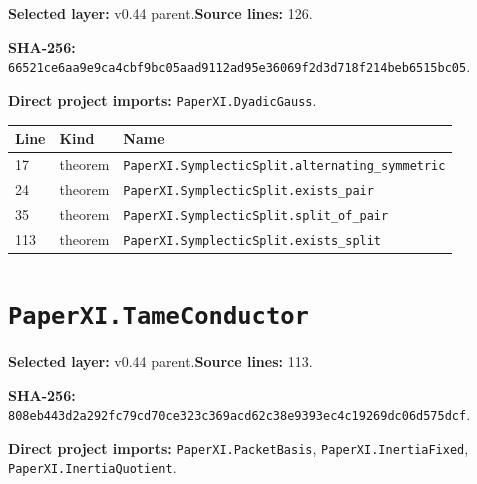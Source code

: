 \documentclass[10pt,oneside]{book}
\begin{document}
\textbf{Selected layer:} v0.44 parent.\quad\textbf{Source lines:} 126.\par\textbf{SHA-256:} {\scriptsize\nolinkurl{66521ce6aa9e9ca4cbf9bc05aad9112ad95e36069f2d3d718f214beb6515bc05}}.


\textbf{Direct project imports:} \nolinkurl{PaperXI.DyadicGauss}.

\begin{longtable}{@{}p{}p{}p{}@{}}\toprule Line&Kind&Name\\\midrule\endhead

17&theorem&\nolinkurl{PaperXI.SymplecticSplit.alternating_symmetric}\\

24&theorem&\nolinkurl{PaperXI.SymplecticSplit.exists_pair}\\

35&theorem&\nolinkurl{PaperXI.SymplecticSplit.split_of_pair}\\

113&theorem&\nolinkurl{PaperXI.SymplecticSplit.exists_split}\\

\bottomrule\end{longtable}

\section{\texorpdfstring{\nolinkurl{PaperXI.TameConductor}}{PaperXI.TameConductor}}\label{module:PaperXI.TameConductor}

\textbf{Selected layer:} v0.44 parent.\quad\textbf{Source lines:} 113.\par\textbf{SHA-256:} {\scriptsize\nolinkurl{808eb443d2a292fc79cd70ce323c369acd62c38e9393ec4c19269dc06d575dcf}}.


\textbf{Direct project imports:} \nolinkurl{PaperXI.PacketBasis}, \nolinkurl{PaperXI.InertiaFixed}, \nolinkurl{PaperXI.InertiaQuotient}.
\end{document}
